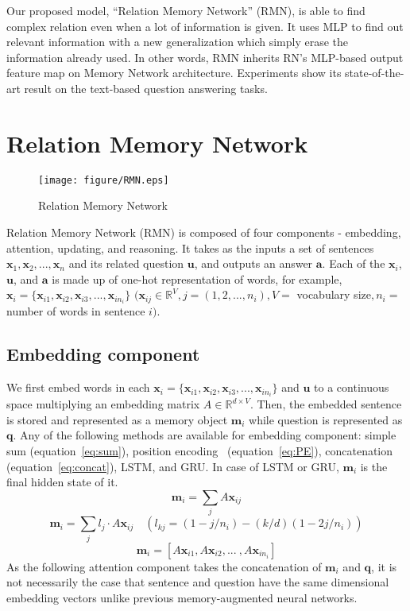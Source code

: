 \documentclass{article} \usepackage{iclr2018_conference,times}
\renewcommand{\vec}[1]{\mathbf{#1}}
\begin{document}
Our proposed model, “Relation Memory Network” (RMN), is able to find complex relation even when a lot of information is given.
It uses MLP to find out relevant information with a new generalization which simply erase the information already used.
In other words, RMN inherits RN's MLP-based output feature map on Memory Network architecture.
Experiments show its state-of-the-art result on the text-based question answering tasks. 

\section{Relation Memory Network}



\begin{figure}[h!]
\centering
	\texttt{[image: figure/RMN.eps]}
	\caption{Relation Memory Network}
	\label{fig:RMN}
\end{figure}

Relation Memory Network (RMN) is composed of four components - embedding, attention, updating, and reasoning.
It takes as the inputs a set of sentences $\vec{x}_1, \vec{x}_2, ..., \vec{x}_n$ and its related question $\vec{u}$, and outputs an answer $\vec{a}$.
Each of the $\vec{x}_i$, $\vec{u}$, and $\vec{a}$ is made up of one-hot representation of words, for example, $\vec{x}_i = \{ \vec{x}_{i1}, \vec{x}_{i2}, \vec{x}_{i3}, ..., \vec{x}_{in_i}\}$ $(\vec{x}_{ij} \in \mathbb{R}^{V}, j = (1,2,...,n_i), V=$ vocabulary size$, n_i=$ number of words in sentence $i)$.


\subsection{Embedding component} 
We first embed words in each $\vec{x}_i = \{\vec{x}_{i1}, \vec{x}_{i2}, \vec{x}_{i3}, ..., \vec{x}_{in_i}\}$ and $\vec{u}$ to a continuous space multiplying an embedding matrix $A \in \mathbb{R}^{d \times V}$.
Then, the embedded sentence is stored and represented as a memory object $\vec{m}_i$ while question is represented as $\vec{q}$.
Any of the following methods are available for embedding component: simple sum (equation~\ref{eq:sum}), position encoding~\citep{Weston15} (equation~\ref{eq:PE}), concatenation (equation~\ref{eq:concat}), LSTM, and GRU.
In case of LSTM or GRU, $\vec{m}_i$ is the final hidden state of it.
\begin{equation}\label{eq:sum}
\vec{m}_i = \sum_j A \vec{x}_{ij}
\end{equation}
\begin{equation}\label{eq:PE}
\vec{m}_i = \sum_j l_j \cdot A \vec{x}_{ij} \quad (l_{kj} = (1-j/n_i) - (k/d)(1-2j/n_i))
\end{equation}
\begin{equation}\label{eq:concat}
\vec{m}_i = [A \vec{x}_{i1}, A \vec{x}_{i2}, ...\ , A \vec{x}_{in_i}]
\end{equation}
As the following attention component takes the concatenation of $\vec{m}_i$ and $\vec{q}$, it is not necessarily the case that sentence and question have the same dimensional embedding vectors unlike previous memory-augmented neural networks.
\end{document}
